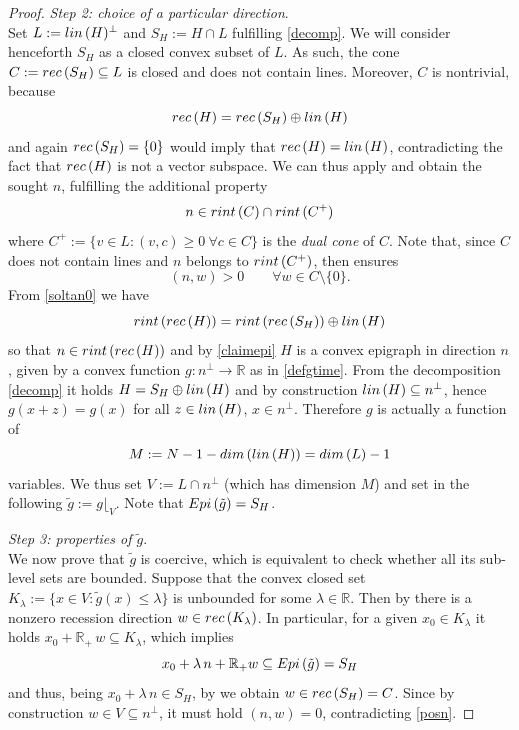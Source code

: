 \documentclass[12pt]{amsart}
\numberwithin{equation}{section}
\theoremstyle{plain}
\theoremstyle{plain}
\theoremstyle{plain}
\theoremstyle{definition}
\newcommand{\R}{{\mathbb R}}
\newcommand{\beq}{\begin{equation}}
\newcommand{\eeq}{\end{equation}}
\renewcommand{\le}{\leqslant}
\renewcommand{\ge}{\geqslant}
\begin{document}
\begin{proof}
\smallskip
 {\em Step 2: choice of a particular direction}.\ \\
Set $L:={\rm lin}\, (H)^{\bot}$ and $S_H:=H\cap L$ fulfilling \eqref{decomp}. 
We will consider henceforth $S_H$ as a closed convex subset of $L$. 
As such, the cone $C:={\rm rec}\, (S_H)\subseteq L$ is closed and does not contain lines. Moreover, $C$ is nontrivial, because 
\[
{\rm rec}\, (H)={\rm rec}\, (S_H)\oplus {\rm lin}\, (H)
\]
and again ${\rm rec}\, (S_H)=\{0\}$ would imply that ${\rm rec}\, (H)={\rm lin}\, (H)$, contradicting the fact that ${\rm rec}\, (H)$ is not a vector subspace.
We can thus apply \cite[Corollary 3.1]{Sol18} and obtain the sought $n$, fulfilling the additional property
\[
n\in {\rm rint}\, (C)\cap {\rm rint}\, (C^+)
\]
where 
$
C^+:=\{v\in L: (v, c)\ge 0\ \forall c\in C\} 
$
is the \emph{dual cone} of $C$. 
Note that, since $C$ does not contain lines and $n$ belongs to ${\rm rint}\, (C^+)$, then \cite[Proposition 2.4, (6)]{Sol18} ensures
\beq
\label{posn}
(n, w)>0\qquad \forall w\in C\setminus\{0\}.
\eeq
From \eqref{soltan0}
we have
\begin{equation}\label{eq_decom_rint}
{\rm rint}\, ({\rm rec}\, (H))={\rm rint}\, ({\rm rec}\, (S_H)) \oplus {\rm lin}\, (H)
\end{equation}
 so that $n\in {\rm rint}\, ({\rm rec}\, (H))$ and by \eqref{claimepi} $H$ is a convex epigraph in direction $n$, given by a convex function $g:n^{\bot}\to \R$ as in \eqref{defgtime}. 
From the decomposition \eqref{decomp} it holds $H=S_H\oplus {\rm lin}\, (H)$ and by construction $ {\rm lin}\, (H)\subseteq n^\bot$, 
 hence $g(x+ z)=g(x)$ for all $z\in {\rm lin}\, (H)$, $x\in n^\bot$. 
Therefore $g$ is actually a function of 
\[
M:=N-1-{\rm dim}\, ({\rm lin}\, (H))= {\rm dim}\, (L) -1
\]
variables. 
We thus set $V:=L\cap n^{\bot}$ (which has dimension $M$) and set in the following $\tilde{g}:=g\lfloor_V$. 
Note that ${\rm Epi}\, (\tilde{g})=S_H$.

\smallskip
 {\em Step 3: properties of $\tilde{g}$}.\ \\
We now prove that $\tilde{g} $ is coercive, which is equivalent to check whether all its sub-level sets are bounded. 
Suppose that the convex closed set $ K_\lambda:=\{x\in V:\tilde{g}(x)\le \lambda\}$ is unbounded for some $\lambda\in \R$. 
Then by \cite[Theorem 8.4]{Roc96} there is a nonzero recession direction $w\in {\rm rec}\, (K_\lambda)$. 
In particular, for a given $x_0\in K_\lambda$ it holds $x_0+\R_+\, w\subseteq K_\lambda$, which implies 
\[
x_0+ \lambda\, n+\R_+ w\subseteq {\rm Epi}\, (\tilde{g})=S_H
\]
 and thus, being $x_0+\lambda\, n \in S_H$, by \cite[Theorem 8.3]{Roc96} we obtain $w\in {\rm rec}\, (S_H)=C$. Since by construction $w\in V\subseteq n^\bot$, it must hold $(n, w)=0$, contradicting \eqref{posn}.


\end{proof}
\end{document}
